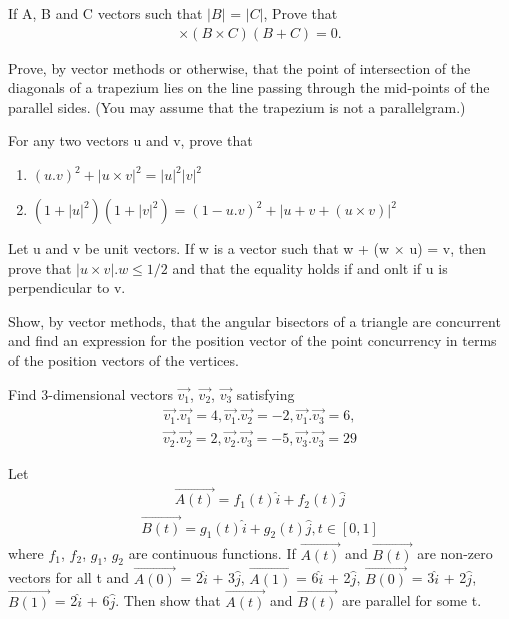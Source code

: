 \item If A, B and C vectors such that $|B|$ = $|C|$, Prove that
\begin{align*}
[(A+B) \times (A+C)] \times (B \times C)(B + C) = 0.
\end{align*}

\item Prove, by vector methods or otherwise, that the point of intersection of the diagonals of a trapezium lies on the line passing through the mid-points of the parallel sides. (You may assume that the trapezium is not a parallelgram.)

\item For any two vectors u and v, prove that
\begin{enumerate}
\item $(u.v)^{2} + |u \times v|^{2} = |u|^{2}|v|^{2}$
\item $(1 + |u|^{2})(1 + |v|^{2}) = (1 - u.v)^{2} + |u + v + (u \times v)|^{2}$
\end{enumerate}

\item Let u and v be unit vectors. If w is a vector such that w + (w $\times$ u) = v, then prove that $|u \times v|.w \leq 1/2$ and that the equality holds if and onlt if u is perpendicular to v.

\item Show, by vector methods, that the angular bisectors of a triangle are concurrent and find an expression for the position vector of the point concurrency in terms of the position vectors of the vertices.

\item Find 3-dimensional vectors $\overrightarrow{v_1}$, $\overrightarrow{v_2}$, $\overrightarrow{v_3}$ satisfying
\begin{align*}
\overrightarrow{v_1}.\overrightarrow{v_1} = 4, \overrightarrow{v_1}.\overrightarrow{v_2} = -2, \overrightarrow{v_1}.\overrightarrow{v_3} = 6, 
\end{align*}
\begin{align*}
\overrightarrow{v_2}.\overrightarrow{v_2} = 2, \overrightarrow{v_2}.\overrightarrow{v_3} = -5, \overrightarrow{v_3}.\overrightarrow{v_3} = 29
\end{align*}

\item Let 
\begin{align*}
\overrightarrow{A(t)} = f_1(t)\hat{i} + f_2(t)\hat{j}
\end{align*}
\begin{align*}
\overrightarrow{B(t)} = g_1(t)\hat{i} + g_2(t)\hat{j}, t \in [0,1]
\end{align*}
where $f_1$, $f_2$, $g_1$, $g_2$ are continuous functions. If $\overrightarrow{A(t)}$ and $\overrightarrow{B(t)}$ are non-zero vectors for all t and $\overrightarrow{A(0)}$ = 2$\hat{i}$ + 3$\hat{j}$, $\overrightarrow{A(1)}$ = 6$\hat{i}$ + 2$\hat{j}$, $\overrightarrow{B(0)}$ = 3$\hat{i}$ + 2$\hat{j}$, 
$\overrightarrow{B(1)}$ = 2$\hat{i}$ + 6$\hat{j}$. Then show that $\overrightarrow{A(t)}$ and $\overrightarrow{B(t)}$ are parallel for some t.

